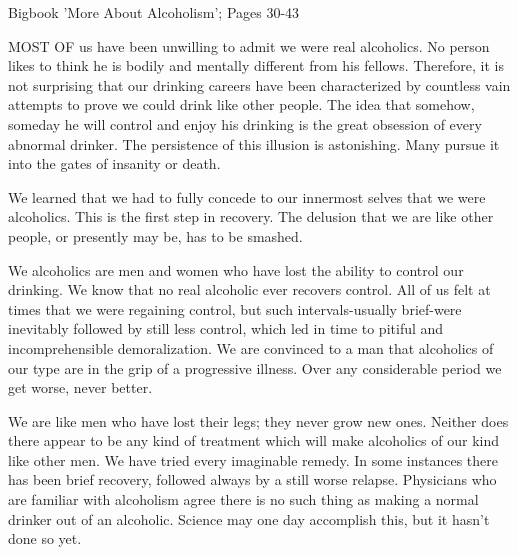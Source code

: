 

Bigbook 'More About Alcoholism'; Pages 30-43


\begin{biblechapter}
    MOST OF us have been unwilling to admit we were real alcoholics. 
\verse No person likes to think he is bodily and mentally 
    different from his fellows.  
\verse Therefore, it is not surprising that our drinking careers 
    have been characterized by countless vain attempts 
    to prove we could drink like other people.  
\verse The idea that somehow, someday 
    he will control and enjoy his drinking 
    is the great obsession of every abnormal drinker.  
\verse The persistence of this illusion is astonishing.  
\verse Many pursue it into the gates of insanity or death.

\verse We learned that we had to fully concede to our innermost selves 
    that we were alcoholics. 
\verse This is the first step in recovery. 
\verse The delusion that we are like other people, 
    or presently may be, has to be smashed.
\end{biblechapter}


\begin{biblechapter}
    We alcoholics are men and women 
    who have lost the ability to control our drinking. 
\verse We know that no real alcoholic ever recovers control. 
\verse All of us felt at times that we were regaining control, 
    but such intervals-usually brief-were inevitably followed 
    by still less control, 
    which led in time to pitiful and incomprehensible demoralization. 
\verse We are convinced to a man that alcoholics of our type 
    are in the grip of a progressive illness. 
\verse Over any considerable period we get worse, never better.

\verse We are like men who have lost their legs; they never grow new ones. 
\verse Neither does there appear to be any kind of treatment which will make alcoholics of our kind like other men. 
\verse We have tried every imaginable remedy. 
\verse In some instances there has been brief recovery, followed always by a still worse relapse. 
\verse Physicians who are familiar with alcoholism 
    agree there is no such thing as making 
    a normal drinker out of an alcoholic. 
\verse Science may one day accomplish this, but it hasn't done so yet.
\end{biblechapter}


